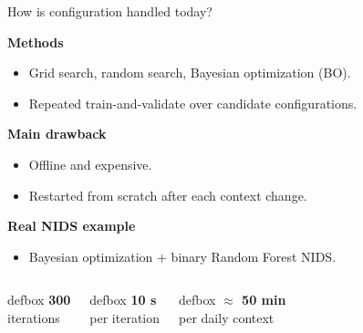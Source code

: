\begin{frame}{How is configuration handled today?}
	\small

	{\normalsize\textbf{Methods}}\\[-0.05em]
	\begin{itemize}
		\footnotesize
		\setlength\itemsep{0.15em}
		\item Grid search, random search, Bayesian optimization (BO).
		\item Repeated train-and-validate over candidate configurations.
	\end{itemize}

	\vspace{0.1em}
	{\normalsize\textbf{Main drawback}}\\[-0.05em]
	\begin{itemize}
		\footnotesize
		\setlength\itemsep{0.15em}
		\item Offline and expensive.
		\item Restarted from scratch after each context change.
	\end{itemize}

	\vspace{0.1em}
	{\normalsize\textbf{Real NIDS example}}\\[0.15em]
	\begin{itemize}
		\footnotesize
		\setlength\itemsep{0.1em}
		\item Bayesian optimization + binary Random Forest NIDS.
	\end{itemize}

	\vspace{0.18em}
	\begin{columns}[T,onlytextwidth]
		\begin{beamercolorbox}[rounded=true,shadow=true,wd=\linewidth,sep=0.8ex,center]{defbox}
			\Large\textbf{300}\\[-0.15em]
			\scriptsize iterations
		\end{beamercolorbox}

		\begin{beamercolorbox}[rounded=true,shadow=true,wd=\linewidth,sep=0.8ex,center]{defbox}
			\Large\textbf{10 s}\\[-0.15em]
			\scriptsize per iteration
		\end{beamercolorbox}

		\begin{beamercolorbox}[rounded=true,shadow=true,wd=\linewidth,sep=0.8ex,center]{defbox}
			\Large\textbf{$\approx$ 50 min}\\[-0.15em]
			\scriptsize per daily context
		\end{beamercolorbox}
	\end{columns}


\end{frame}
